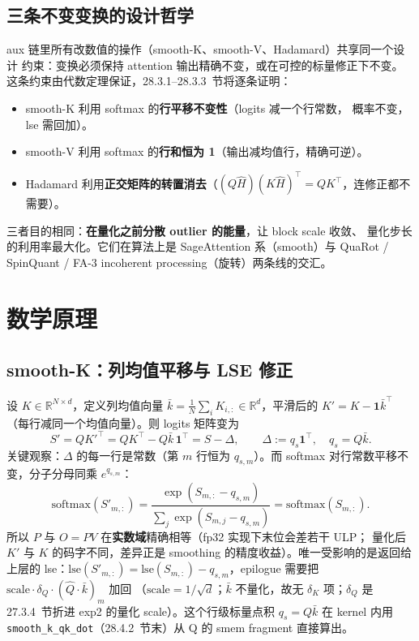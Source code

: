 \subsection{三条不变变换的设计哲学}

aux 链里所有改数值的操作（smooth-K、smooth-V、Hadamard）共享同一个设计
约束：变换必须保持 attention 输出精确不变，或在可控的标量修正下不变。
这条约束由代数定理保证，28.3.1--28.3.3~节将逐条证明：
\begin{itemize}[itemsep=1pt,topsep=2pt]
  \item smooth-K 利用 softmax 的\textbf{行平移不变性}（logits 减一个行常数，
        概率不变，lse 需回加）。
  \item smooth-V 利用 softmax 的\textbf{行和恒为 1}（输出减均值行，精确可逆）。
  \item Hadamard 利用\textbf{正交矩阵的转置消去}（$(Q\hat H)(K\hat H)^{\top} =
        QK^{\top}$，连修正都不需要）。
\end{itemize}

三者目的相同：\textbf{在量化之前分散 outlier 的能量}，让 block scale 收敛、
量化步长的利用率最大化。它们在算法上是 SageAttention 系（smooth）与 QuaRot /
SpinQuant / FA-3 incoherent processing（旋转）两条线的交汇。

\section{数学原理}

\subsection{smooth-K：列均值平移与 LSE 修正}\label{sec:28-smk}

设 $K\in\mathbb{R}^{N\times d}$，定义列均值向量
$\bar k = \tfrac{1}{N}\sum_{i} K_{i,:}\in\mathbb{R}^{d}$，平滑后的
$K' = K - \mathbf{1}\bar k^{\top}$（每行减同一个均值向量）。则 logits 矩阵变为
\begin{equation}
  S' = QK'^{\top} = QK^{\top} - Q\bar k\,\mathbf{1}^{\top} = S - \Delta,
  \qquad \Delta \mathrel{:=} q_s \mathbf{1}^{\top},\quad q_s = Q\bar k .
  \label{eq:28-smk-shift}
\end{equation}
关键观察：$\Delta$ 的每一行是常数（第 $m$ 行恒为 $q_{s,m}$）。而 softmax
对行常数平移不变，分子分母同乘 $e^{q_{s,m}}$：
\begin{equation}
  \mathrm{softmax}\!\left(S'_{m,:}\right)
  = \frac{\exp(S_{m,:} - q_{s,m})}{\sum_j \exp(S_{m,j} - q_{s,m})}
  = \mathrm{softmax}\!\left(S_{m,:}\right).
  \label{eq:28-smk-invariant}
\end{equation}
所以 $P$ 与 $O = PV$ 在\textbf{实数域}精确相等（fp32 实现下末位会差若干 ULP；
量化后 $K'$ 与 $K$ 的码字不同，差异正是 smoothing 的精度收益）。唯一受影响的是返回给
上层的 lse：$\mathrm{lse}(S'_{m,:}) = \mathrm{lse}(S_{m,:}) - q_{s,m}$，epilogue
需要把 $\mathrm{scale}\cdot\delta_Q\cdot(\hat Q\cdot\bar k)_m$ 加回
（$\mathrm{scale}=1/\sqrt d$；$\bar k$ 不量化，故无 $\delta_K$ 项；$\delta_Q$ 是
27.3.4~节折进 exp2 的量化 scale）。这个行级标量点积 $q_s = Q\bar k$ 在 kernel 内用
\texttt{smooth\_k\_qk\_dot}（28.4.2~节末）从 Q 的 smem fragment 直接算出。

